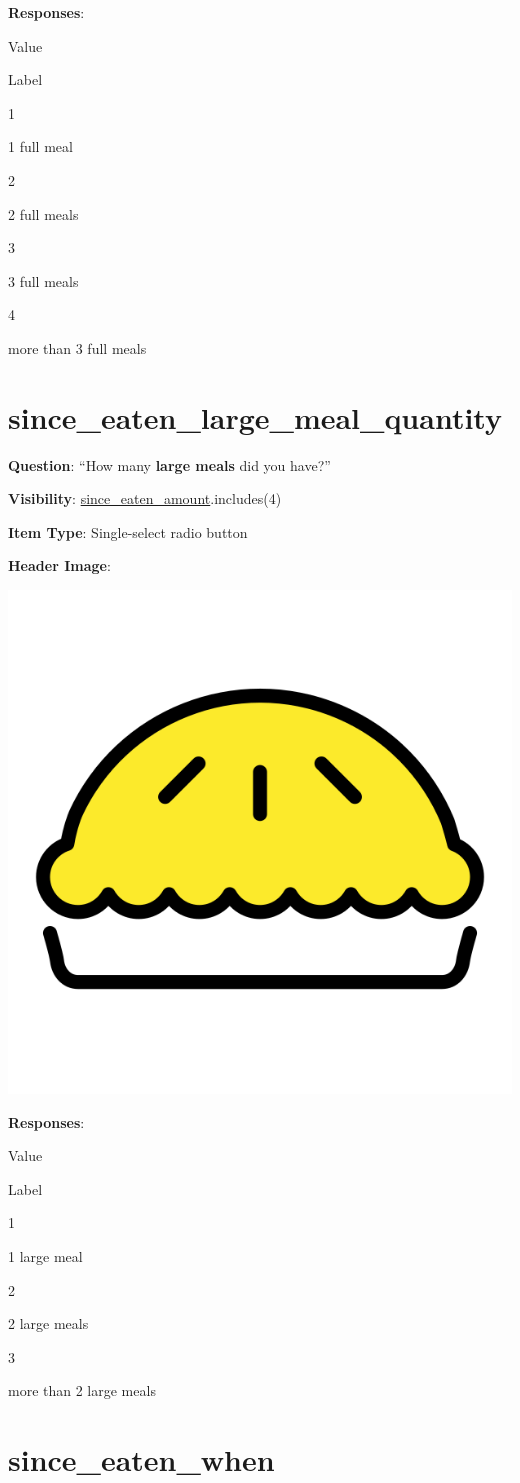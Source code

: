 \documentclass[]{book}
\begin{document}
\textbf{Responses}:

Value

Label

1

1 full meal

2

2 full meals

3

3 full meals

4

more than 3 full meals

\hypertarget{since_eaten_large_meal_quantity}{%
\section{since\_eaten\_large\_meal\_quantity}\label{since_eaten_large_meal_quantity}}

\textbf{Question}: ``How many \textbf{large meals} did you have?''

\textbf{Visibility}: \protect\hyperlink{since_eaten_amount}{since\_eaten\_amount}.includes(4)

\textbf{Item Type}: Single-select radio button

\textbf{Header Image}:

\begin{flushleft}\includegraphics[width=0.33\linewidth]{downloadFigs4latex_NIMH_Applet_Codebook/since_eaten_large_meal_quantity_headerImg} \end{flushleft}

\textbf{Responses}:

Value

Label

1

1 large meal

2

2 large meals

3

more than 2 large meals

\hypertarget{since_eaten_when}{%
\section{since\_eaten\_when}\label{since_eaten_when}}
\end{document}
